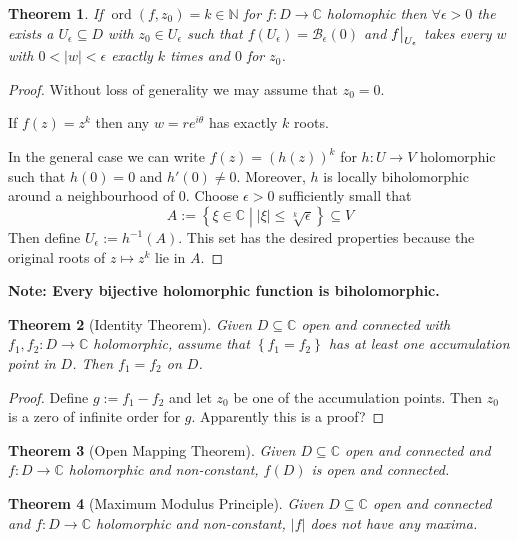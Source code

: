 \documentclass[11pt]{article}
\newcommand{\defeq}{:=}
\newcommand{\abs}[1]{\left|#1\right|}
\DeclareMathOperator{\ord}{\text{ord}}
\newcommand{\relmiddle}[1]{\mathrel{}\middle#1\mathrel{}}
\newcommand{\rmv}{\relmiddle|}
\newcommand\restr[2]{{%
  \left.\kern-\nulldelimiterspace %
  #1 %
  \vphantom{\big|} %
  \right|_{#2} %
  }}
\newcommand{\C}{\mathbb{C}}
\newcommand{\N}{\mathbb{N}}
\newenvironment{note}
	{\begin{mdframed}[backgroundcolor=white, linecolor=red, roundcorner=5pt, linewidth=1pt]\bfseries{Note:}\normalfont}
	{\end{mdframed}}
\newtheorem{theorem}{Theorem}[section]
\begin{document}
\begin{theorem}
If $\ord(f, z_0)=k\in\N$ for $f:D\to\C$ holomophic then $\forall\epsilon >0$ the exists a $U_\epsilon\subseteq D$ with $z_0\in U_\epsilon$ such that $f(U_\epsilon)=\mathcal{B}_\epsilon(0)$ and $\restr{f}{U_\epsilon}$ takes every $w$ with $0<\abs{w}<\epsilon$ exactly $k$ times and $0$ for $z_0$.
\end{theorem}

\begin{proof}
Without loss of generality we may assume that $z_0=0$.

If $f(z)=z^k$ then any $w=re^{i\theta}$ has exactly $k$ roots.

In the general case we can write $f(z)=(h(z))^k$ for $h:U\to V$ holomorphic such that $h(0)=0$ and $h'(0)\neq 0$.
Moreover, $h$ is locally biholomorphic around a neighbourhood of $0$.
Choose $\epsilon>0$ sufficiently small that
\[
	A\defeq\left\{\xi\in\C \rmv \abs{\xi}\leq\sqrt[k]{\epsilon}\right\}\subseteq V
\]
Then define $U_\epsilon\defeq h^{-1}(A)$.
This set has the desired properties because the original roots of $z\mapsto z^k$ lie in $A$.
\end{proof}

\begin{note}
Every bijective holomorphic function is biholomorphic.
\end{note}

\begin{theorem}[Identity Theorem]
Given $D\subseteq\C$ open and connected with $f_1, f_2:D\to\C$ holomorphic, assume that $\left\{f_1=f_2\right\}$ has at least one accumulation point in $D$.
Then $f_1=f_2$ on $D$.
\end{theorem}

\begin{proof}
Define $g\defeq f_1 - f_2$ and let $z_0$ be one of the accumulation points.
Then $z_0$ is a zero of infinite order for $g$.
Apparently this is a proof?
\end{proof}

\begin{theorem}[Open Mapping Theorem]
Given $D\subseteq\C$ open and connected and $f:D\to\C$ holomorphic and non-constant, $f(D)$ is open and connected.
\end{theorem}

\begin{theorem}[Maximum Modulus Principle]
Given $D\subseteq\C$ open and connected and $f:D\to\C$ holomorphic and non-constant, $\abs{f}$ does not have any maxima.
\end{theorem}
\end{document}
